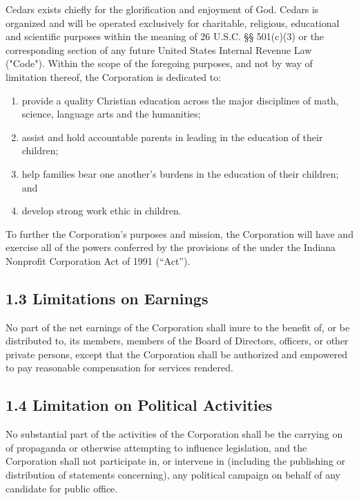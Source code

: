 \documentclass[
]{book}
\begin{document}
Cedars exists chiefly for the glorification and enjoyment of God. Cedars is organized and will be operated exclusively for charitable, religious, educational and scientific purposes within the meaning of 26 U.S.C. §§ 501(c)(3) or the corresponding section of any future United States Internal Revenue Law ("Code"). Within the scope of the foregoing purposes, and not by way of limitation thereof, the Corporation is dedicated to:

\begin{enumerate}
\def\labelenumi{\alph{enumi}.}
\item
  provide a quality Christian education across the major disciplines of math, science, language arts and the humanities;
\item
  assist and hold accountable parents in leading in the education of their children;
\item
  help families bear one another's burdens in the education of their children; and
\item
  develop strong work ethic in children.
\end{enumerate}

To further the Corporation's purposes and mission, the Corporation will have and exercise all of the powers conferred by the provisions of the under the Indiana Nonprofit Corporation Act of 1991 (``Act'').

\subsection{1.3 Limitations on Earnings}\label{limitations-on-earnings}

No part of the net earnings of the Corporation shall inure to the benefit of, or be distributed to, its members, members of the Board of Directors, officers, or other private persons, except that the Corporation shall be authorized and empowered to pay reasonable compensation for services rendered.

\subsection{1.4 Limitation on Political Activities}\label{limitation-on-political-activities}

No substantial part of the activities of the Corporation shall be the carrying on of propaganda or otherwise attempting to influence legislation, and the Corporation shall not participate in, or intervene in (including the publishing or distribution of statements concerning), any political campaign on behalf of any candidate for public office.
\end{document}
